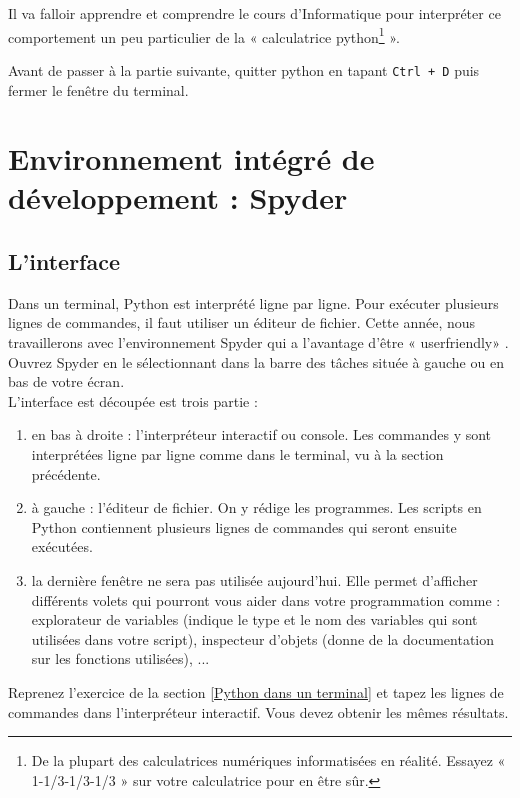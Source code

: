 Il va falloir apprendre et comprendre le cours d'Informatique pour interpréter ce comportement un peu particulier de la « calculatrice python\footnote{De la plupart des calculatrices numériques informatisées en réalité. Essayez « 1-1/3-1/3-1/3 » sur votre calculatrice pour en être sûr.} ».

Avant de passer à la partie suivante, quitter python en tapant \texttt{Ctrl + D} puis fermer le fenêtre du terminal.

\section{Environnement intégré de développement : Spyder}

\subsection{L'interface}
Dans un terminal, Python est interpr\' et\' e ligne par ligne. Pour ex\' ecuter plusieurs lignes de commandes, il faut utiliser un \' editeur de fichier. Cette ann\' ee, nous travaillerons avec l'environnement Spyder qui a l'avantage d'\^ etre « userfriendly» .\\
Ouvrez Spyder en le s\' electionnant dans la barre des t\^ aches situ\' ee \` a gauche ou en bas de votre \' ecran.\\
L'interface est d\' ecoup\' ee est trois partie :
\begin{enumerate}
\item en bas \`  a droite : l'interpr\' eteur interactif ou console. Les commandes y sont interpr\' et\' ees ligne par ligne comme dans le terminal, vu \` a la section pr\' ec\' edente.
\item \` a gauche : l'\' editeur de fichier. On y r\' edige les programmes. Les scripts en Python contiennent plusieurs lignes de commandes qui seront ensuite ex\' ecut\' ees.
\item la derni\` ere fen\^ etre ne sera pas utilis\' ee aujourd'hui. Elle permet d'afficher diff\' erents volets qui pourront vous aider dans votre programmation comme : explorateur de variables (indique le type et le nom des variables qui sont utilis\' ees dans votre script), inspecteur d'objets (donne de la documentation sur les fonctions utilis\' ees), ...
\end{enumerate}


\begin{exercice}

Reprenez l'exercice de la section \ref{Python dans un terminal} et tapez les lignes de commandes dans l'interpr\' eteur interactif. Vous devez obtenir les m\^ emes r\' esultats.
\end{exercice}



